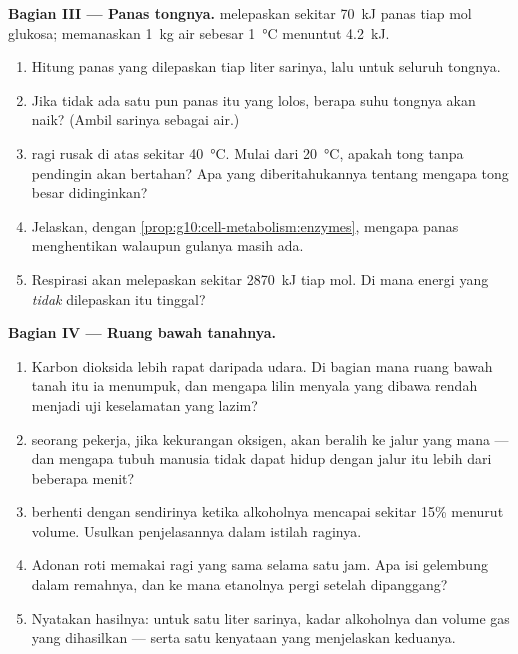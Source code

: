 \begin{problem}
\medskip
\noindent\textbf{Bagian III --- Panas tongnya.}
 melepaskan sekitar \qty{70}{kJ} panas tiap mol glukosa;
memanaskan \qty{1}{kg} air sebesar \qty{1}{\celsius} menuntut \qty{4.2}{kJ}.
\begin{enumerate}[resume]
  \item Hitung panas yang dilepaskan tiap liter sarinya, lalu untuk
        seluruh tongnya.
  \item Jika tidak ada satu pun panas itu yang lolos, berapa suhu
        tongnya akan naik? (Ambil sarinya sebagai air.)
  \item {} ragi rusak di atas sekitar \qty{40}{\celsius}. Mulai dari
        \qty{20}{\celsius}, apakah tong tanpa pendingin akan bertahan?
        Apa yang diberitahukannya tentang mengapa tong besar didinginkan?
  \item Jelaskan, dengan \cref{prop:g10:cell-metabolism:enzymes},
        mengapa panas menghentikan  walaupun gulanya masih ada.
  \item Respirasi akan melepaskan sekitar \qty{2870}{kJ} tiap mol. Di
        mana energi yang \emph{tidak} dilepaskan  itu tinggal?
\end{enumerate}

\medskip
\noindent\textbf{Bagian IV --- Ruang bawah tanahnya.}
\begin{enumerate}[resume]
  \item Karbon dioksida lebih rapat daripada udara. Di bagian mana
        ruang bawah tanah itu ia menumpuk, dan mengapa lilin menyala
        yang dibawa rendah menjadi uji keselamatan yang lazim?
  \item {} seorang pekerja, jika kekurangan oksigen, akan beralih ke
        jalur yang mana --- dan mengapa tubuh manusia tidak dapat hidup
        dengan jalur itu lebih dari beberapa menit?
  \item {} berhenti dengan sendirinya ketika alkoholnya
        mencapai sekitar 15\% menurut volume. Usulkan penjelasannya
        dalam istilah  raginya.
  \item Adonan roti memakai ragi yang sama selama satu jam. Apa isi
        gelembung dalam remahnya, dan ke mana etanolnya pergi setelah
        dipanggang?
  \item Nyatakan hasilnya: untuk satu liter sarinya, kadar alkoholnya
        dan volume gas yang dihasilkan --- serta satu kenyataan
         yang menjelaskan keduanya.
\end{enumerate}
\end{problem}
